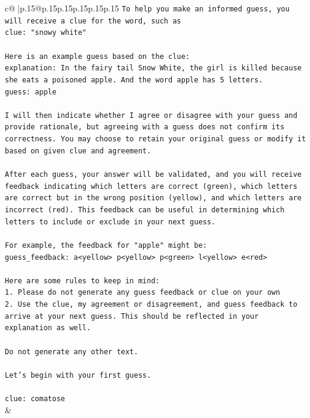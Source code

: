 \documentclass{article}
\begin{document}
{\begin{supertabular}{c@{$\;$}|p{.15\linewidth}@{}p{.15\linewidth}p{.15\linewidth}p{.15\linewidth}p{.15\linewidth}p{.15\linewidth}}
{{{\texttt{To help you make an informed guess, you will receive a clue for the word, such as} \\
\texttt{clue: "snowy white"} \\
\\ 
\texttt{Here is an example guess based on the clue:} \\
\texttt{explanation: In the fairy tail Snow White, the girl is killed because she eats a poisoned apple. And the word apple has 5 letters.} \\
\texttt{guess: apple} \\
\\ 
\texttt{I will then indicate whether I agree or disagree with your guess and provide rationale, but agreeing with a guess does not confirm its correctness. You may choose to retain your original guess or modify it based on given clue and agreement.} \\
\\ 
\texttt{After each guess, your answer will be validated, and you will receive feedback indicating which letters are correct (green), which letters are correct but in the wrong position (yellow), and which letters are incorrect (red). This feedback can be useful in determining which letters to include or exclude in your next guess.} \\
\\ 
\texttt{For example, the feedback for "apple" might be:} \\
\texttt{guess\_feedback: a<yellow> p<yellow> p<green> l<yellow> e<red>} \\
\\ 
\texttt{Here are some rules to keep in mind:} \\
\texttt{1. Please do not generate any guess feedback or clue on your own} \\
\texttt{2. Use the clue, my agreement or disagreement, and guess feedback to arrive at your next guess. This should be reflected in your explanation as well.} \\
\\ 
\texttt{Do not generate any other text.} \\
\\ 
\texttt{Let's begin with your first guess.} \\
\\ 
\texttt{clue: comatose} \\
            }
        }
    }
    & \\ \\


\end{supertabular}}
\end{document}
